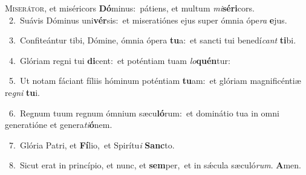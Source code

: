 \lettrine{\initial\textcolor{\initialcolor}{M}}{iserátor,} et miséricors \textbf{Dó}\-minus:~\star pátiens, et multum \textit{mi}\-\textbf{sé}\textbf{ri}cors.\\
{\numbfont\textcolor{\numbcolor}{~2.}}~Suávis Dóminus uni\-\textbf{vér}\-sis:~\star et miseratiónes ejus super ómnia ópe\textit{ra} \textbf{e}\-jus.\par
{\numbfont\textcolor{\numbcolor}{~3.}}~Confiteántur tibi, Dómine, ómnia ópera \textbf{tu}\-a:~\star et sancti tui benedí\textit{cant} \textbf{ti}\-bi.\par
{\numbfont\textcolor{\numbcolor}{~4.}}~Glóriam regni tui \textbf{di}\-cent:~\star et poténtiam tuam \textit{lo}\-\textbf{quén}tur:\par
{\numbfont\textcolor{\numbcolor}{~5.}}~Ut notam fáciant fíliis hóminum poténtiam \textbf{tu}\-am:~\star et glóriam magnificéntiæ re\textit{gni} \textbf{tu}\-i.\par
{\numbfont\textcolor{\numbcolor}{~6.}}~Regnum tuum regnum ómnium sæcu\-\textbf{ló}\-rum:~\star et dominátio tua in omni generatióne et genera\-\textit{ti}\-\textbf{ó}nem.\par
{\numbfont\textcolor{\numbcolor}{~7.}}~Glória Patri, et \textbf{Fí}\-lio,~\star et Spirítu\textit{i} \textbf{Sanc}\-to.\par
{\numbfont\textcolor{\numbcolor}{~8.}}~Sicut erat in princípio, et nunc, et \textbf{sem}\-per,~\star et in sǽcula sæculó\-\textit{rum}\-. \textbf{A}\-men.\par
